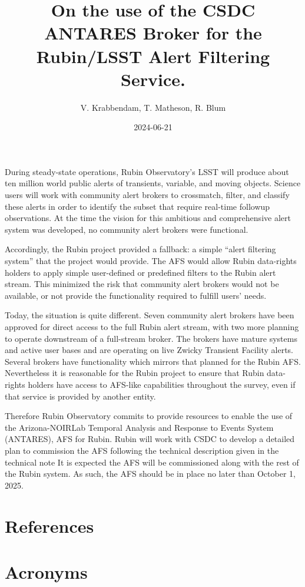 \documentclass[DM,authoryear]{lsstdoc}
\title{On the use of the CSDC ANTARES Broker for the Rubin/LSST Alert Filtering Service.}
\author{V. Krabbendam, T. Matheson, R. Blum}
\date{2024-06-21}
\begin{document}
        
\mkmemotitle

During steady-state operations, Rubin Observatory's LSST will produce about ten million world public alerts of transients, variable, and moving objects. Science users will work with community alert
brokers to crossmatch, filter, and classify these alerts in order to identify the subset that require real-time followup observations. 
At the time the vision for this ambitious and comprehensive alert system was developed, no community alert brokers were functional.

Accordingly, the Rubin project provided a fallback: a simple “alert filtering system” that the project would provide. 
The AFS would allow Rubin data-rights holders to apply simple user-defined or predefined filters to the Rubin alert stream. 
This minimized the risk that community alert brokers would not be available, or not provide the functionality required to fulfill users' needs.

Today, the situation is quite different. 
Seven community alert brokers have been approved for direct access to the full Rubin alert stream, with two more planning to operate downstream of a full-stream broker. 
The brokers have mature systems and active user bases and are operating on live Zwicky Transient Facility alerts. 
Several brokers have functionality which mirrors that planned for the Rubin AFS. 
Nevertheless it is reasonable for the Rubin project to ensure that Rubin data-rights holders have access to AFS-like capabilities throughout the survey, even if that service is provided by another entity.

Therefore Rubin Observatory commits to provide resources to enable the use of the Arizona-NOIRLab Temporal Analysis and Response to Events System (ANTARES),   \citep{2021AJ....161..107M} AFS for Rubin. 
Rubin will work with CSDC to develop a detailed plan to commission the AFS following the technical description given in the  technical note  
It is expected the AFS will be commissioned along with the rest of the Rubin system. 
As such, the AFS should be in place no later than October 1, 2025.

\clearpage
\appendix
\section{References} \label{sec:bib}
\renewcommand{\refname}{} %


\section{Acronyms} \label{sec:acronyms}

\end{document}
